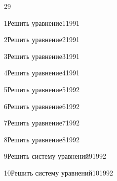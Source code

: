 
\begin{TrigSourcePage}{29}
\label{chap:trigonometry}
\begin{TrigExercise}{1}{Решить уравнение}{1}{1991}
\end{TrigExercise}
\begin{TrigExercise}{2}{Решить уравнение}{2}{1991}
\end{TrigExercise}
\begin{TrigExercise}{3}{Решить уравнение}{3}{1991}
\end{TrigExercise}
\begin{TrigExercise}{4}{Решить уравнение}{4}{1991}
\end{TrigExercise}
\begin{TrigExercise}{5}{Решить уравнение}{5}{1992}
\end{TrigExercise}
\begin{TrigExercise}{6}{Решить уравнение}{6}{1992}
\end{TrigExercise}
\begin{TrigExercise}{7}{Решить уравнение}{7}{1992}
\end{TrigExercise}
\begin{TrigExercise}{8}{Решить уравнение}{8}{1992}
\end{TrigExercise}
\begin{TrigExercise}{9}{Решить систему уравнений}{9}{1992}
\end{TrigExercise}
\begin{TrigExercise}{10}{Решить систему уравнений}{10}{1992}

\end{TrigExercise}
\end{TrigSourcePage}
